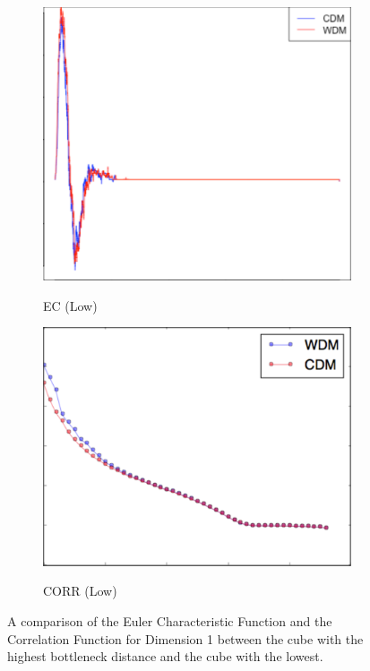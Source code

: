 \documentclass[12pt]{article}
\begin{document}
\begin{figure}[htp!]
    \begin{subfigure}{0.21\textwidth}
    \centering
        \caption{EC (Low)}
\includegraphics[width=\linewidth]{valid3.pdf}
    \label{fig:valid3}
  \end{subfigure}
    \begin{subfigure}{0.24\textwidth}
    \centering
        \caption{CORR (Low)}
\includegraphics[width=\linewidth]{valid4.pdf}
    \label{fig:valid4}
  \end{subfigure}
    \label{fig:validationfigs}
    \caption{A comparison of the Euler Characteristic Function and the Correlation Function for Dimension 1 between the cube with the highest bottleneck distance and the cube with the lowest.}
\end{figure}
\end{document}
